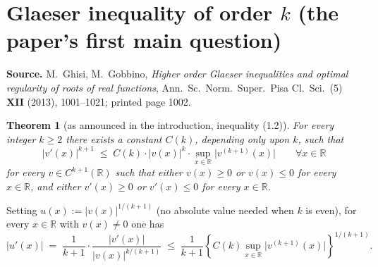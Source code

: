 \documentclass[11pt]{article}
\newtheorem{theorem}{Theorem}
\begin{document}
\section*{Glaeser inequality of order $k$ (the paper's first main question)}

\textbf{Source.} M.~Ghisi, M.~Gobbino, \emph{Higher order Glaeser inequalities and optimal
regularity of roots of real functions}, Ann.\ Sc.\ Norm.\ Super.\ Pisa Cl.\ Sci.\ (5)
\textbf{XII} (2013), 1001--1021; printed page 1002.

\begin{theorem}[as announced in the introduction, inequality (1.2)]
For every integer $k \ge 2$ there exists a constant $C(k)$, depending only upon $k$, such that
\[
|v'(x)|^{k+1} \;\le\; C(k)\cdot |v(x)|^{k}\cdot \sup_{x\in\mathbb{R}} \bigl|v^{(k+1)}(x)\bigr|
\qquad \forall x \in \mathbb{R}
\]
for every $v \in C^{k+1}(\mathbb{R})$ such that either $v(x) \ge 0$ or $v(x) \le 0$ for every
$x \in \mathbb{R}$, and either $v'(x) \ge 0$ or $v'(x) \le 0$ for every $x \in \mathbb{R}$.
\end{theorem}

\begin{remark}
Setting $u(x) := |v(x)|^{1/(k+1)}$ (no absolute value needed when $k$ is even), for every
$x \in \mathbb{R}$ with $v(x) \ne 0$ one has
\[
|u'(x)| \;=\; \frac{1}{k+1}\cdot\frac{|v'(x)|}{|v(x)|^{k/(k+1)}}
\;\le\; \frac{1}{k+1}\left\{ C(k)\sup_{x\in\mathbb{R}}\bigl|v^{(k+1)}(x)\bigr| \right\}^{1/(k+1)} .
\]
\end{remark}
\end{document}
